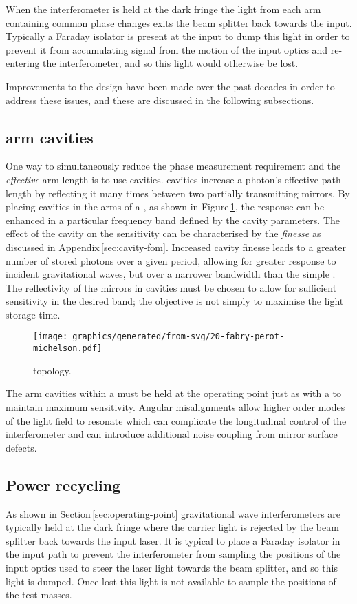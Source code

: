 When the interferometer is held at the dark fringe the light from each arm containing common phase changes exits the beam splitter back towards the input. Typically a Faraday isolator is present at the input to dump this light in order to prevent it from accumulating signal from the motion of the input optics and re-entering the interferometer, and so this light would otherwise be lost.

Improvements to the \MI{} design have been made over the past decades in order to address these issues, and these are discussed in the following subsections.

\subsection{\label{sec:fabry-perot-cavities}\FP{} arm cavities}
One way to simultaneously reduce the phase measurement requirement and the \emph{effective} arm length is to use \FP{} cavities. \FP{} cavities increase a photon's effective path length by reflecting it many times between two partially transmitting mirrors. By placing \FP{} cavities in the arms of a \MI{}, as shown in Figure\,\ref{fig:fpmi}, the response can be enhanced in a particular frequency band defined by the cavity parameters. The effect of the cavity on the sensitivity can be characterised by the \emph{finesse} as discussed in Appendix\,\ref{sec:cavity-fom}. Increased cavity finesse leads to a greater number of stored photons over a given period, allowing for greater response to incident gravitational waves, but over a narrower bandwidth than the simple \MI{}. The reflectivity of the mirrors in \FP{} cavities must be chosen to allow for sufficient sensitivity in the desired band; the objective is not simply to maximise the light storage time.

\begin{figure}
  \centering
  \texttt{[image: graphics/generated/from-svg/20-fabry-perot-michelson.pdf]}
  \caption[\FPMI{}]{\label{fig:fpmi}\FPMI{} topology.}
\end{figure}

The arm cavities within a \FPMI{} must be held at the operating point just as with a \MI{} to maintain maximum sensitivity. Angular misalignments allow higher order modes of the light field to resonate which can complicate the longitudinal control of the interferometer and can introduce additional noise coupling from mirror surface defects.

\subsection{\label{sec:power-recycling}Power recycling}
As shown in Section\,\ref{sec:operating-point} gravitational wave interferometers are typically held at the dark fringe where the carrier light is rejected by the beam splitter back towards the input laser. It is typical to place a Faraday isolator in the input path to prevent the interferometer from sampling the positions of the input optics used to steer the laser light towards the beam splitter, and so this light is dumped. Once lost this light is not available to sample the positions of the test masses.

